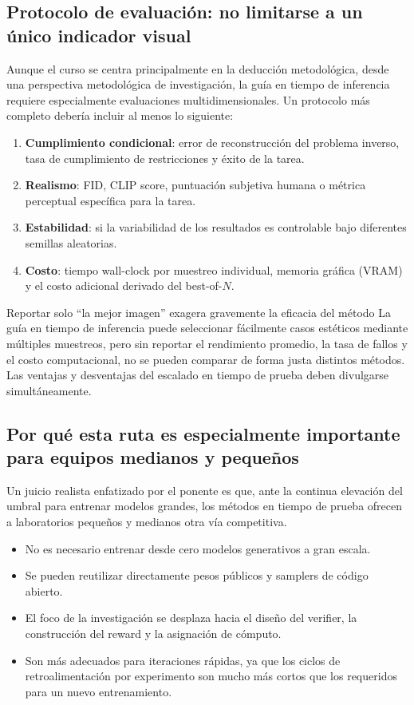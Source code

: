\subsection{Protocolo de evaluación: no limitarse a un único indicador visual}

Aunque el curso se centra principalmente en la deducción metodológica, desde una perspectiva metodológica de investigación, la guía en tiempo de inferencia requiere especialmente evaluaciones multidimensionales. Un protocolo más completo debería incluir al menos lo siguiente:

\begin{enumerate}
    \item \textbf{Cumplimiento condicional}: error de reconstrucción del problema inverso, tasa de cumplimiento de restricciones y éxito de la tarea.
    \item \textbf{Realismo}: FID, CLIP score, puntuación subjetiva humana o métrica perceptual específica para la tarea.
    \item \textbf{Estabilidad}: si la variabilidad de los resultados es controlable bajo diferentes semillas aleatorias.
    \item \textbf{Costo}: tiempo wall-clock por muestreo individual, memoria gráfica (VRAM) y el costo adicional derivado del best-of-$N$.
\end{enumerate}

\begin{warningbox}{Reportar solo ``la mejor imagen'' exagera gravemente la eficacia del método}
La guía en tiempo de inferencia puede seleccionar fácilmente casos estéticos mediante múltiples muestreos, pero sin reportar el rendimiento promedio, la tasa de fallos y el costo computacional, no se pueden comparar de forma justa distintos métodos. Las ventajas y desventajas del escalado en tiempo de prueba deben divulgarse simultáneamente.
\end{warningbox}

\subsection{Por qué esta ruta es especialmente importante para equipos medianos y pequeños}

Un juicio realista enfatizado por el ponente es que, ante la continua elevación del umbral para entrenar modelos grandes, los métodos en tiempo de prueba ofrecen a laboratorios pequeños y medianos otra vía competitiva.

\begin{itemize}
    \item No es necesario entrenar desde cero modelos generativos a gran escala.
    \item Se pueden reutilizar directamente pesos públicos y samplers de código abierto.
    \item El foco de la investigación se desplaza hacia el diseño del verifier, la construcción del reward y la asignación de cómputo.
    \item Son más adecuados para iteraciones rápidas, ya que los ciclos de retroalimentación por experimento son mucho más cortos que los requeridos para un nuevo entrenamiento.
\end{itemize}


